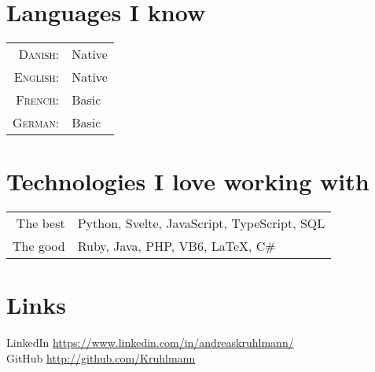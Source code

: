 \documentclass[a4paper,10pt]{article}
\begin{document}
\section{Languages I know}
\begin{tabular}{rl}
 \textsc{Danish:}&Native\\
\textsc{English:}&Native\\
\textsc{French:}&Basic\\
\textsc{German:}&Basic\\
\end{tabular}

\section{Technologies I love working with}
\begin{tabular}{rl}
 The best & Python, Svelte, JavaScript, TypeScript, SQL\\
 The good & Ruby, Java, PHP, VB6, \LaTeX, C\#
\end{tabular}

\section{Links}
LinkedIn \href{https://www.linkedin.com/in/andreaskruhlmann/}{https://www.linkedin.com/in/andreaskruhlmann/}\\
GitHub  \href{https://github.com/Kruhlmann}{http://github.com/Kruhlmann}
\end{document}
